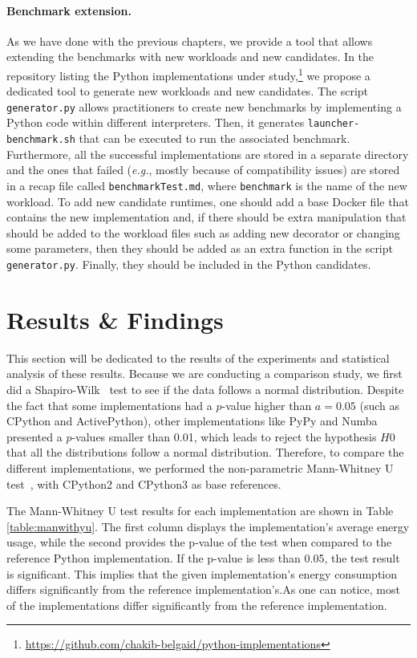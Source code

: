 \paragraph{Benchmark extension.}
As we have done with the previous chapters, we provide a tool that allows extending the benchmarks with new workloads and new candidates.
In the repository listing the Python implementations under study,\footnote{\url{https://github.com/chakib-belgaid/python-implementations}} we propose a dedicated tool to generate new workloads and new candidates.
The script \texttt{generator.py} allows practitioners to create new benchmarks by implementing a Python code within different interpreters.
Then, it generates \texttt{launcher-benchmark.sh} that can be executed to run the associated benchmark.
Furthermore, all the successful implementations are stored in a separate directory and the ones that failed (\emph{e.g.}, mostly because of compatibility issues) are stored in a recap file called \texttt{benchmarkTest.md}, where \texttt{benchmark} is the name of the new workload.
To add new candidate runtimes, one should add a base Docker file that contains the new implementation and, if there should be extra manipulation that should be added to the workload files such as adding new decorator or changing some parameters, then they should be added as an extra function in the script \texttt{generator.py}.
Finally, they should be included in the Python candidates.

\section{Results \& Findings}
This section will be dedicated to the results of the experiments and statistical analysis of these results.
Because we are conducting a comparison study, we first did a Shapiro-Wilk~\cite{shapiro1968comparative} test to see if the data follows a normal distribution.
Despite the fact that some implementations had a $p$-value higher than $a=0.05$ (such as CPython and ActivePython), other implementations like PyPy and Numba presented a $p$-values smaller than 0.01, which leads to reject the hypothesis $H0$ that all the distributions follow a normal distribution.
Therefore, to compare the different implementations, we performed the non-parametric Mann-Whitney U test~\cite{zimmerman1987comparative}, with CPython2 and CPython3 as base references.

The Mann-Whitney U test results for each implementation are shown in Table \ref{table:manwithyu}. The first column displays the implementation's average energy usage, while the second provides the p-value of the test when compared to the reference Python implementation. If the p-value is less than 0.05, the test result is significant. This implies that the given implementation's energy consumption differs significantly from the reference implementation's.As one can notice, most of the implementations differ significantly from the reference implementation.



